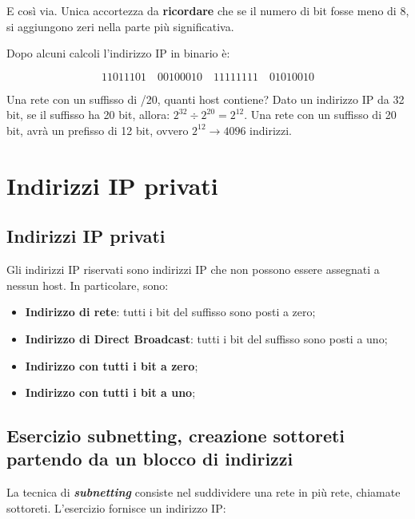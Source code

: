 \documentclass[a4paper]{article}
\newcommand{\binaryaddress}[4]{#1 \hspace{1em} #2 \hspace{1em} #3 \hspace{1em} #4}
\begin{document}
	\noindent
	E così via. Unica accortezza da \textbf{ricordare} che se il numero di bit fosse meno di 8, si aggiungono zeri nella parte più significativa.\newline
	
	\noindent
	Dopo alcuni calcoli l’indirizzo IP in binario è:
	
	\begin{equation*}
		\binaryaddress{11011101}{00100010}{11111111}{01010010}
	\end{equation*}

	\noindent
	Una rete con un suffisso di /20, quanti host contiene? Dato un indirizzo IP da 32 bit, se il suffisso ha 20 bit, allora: $2^{32} \div 2^{20} = 2^{12}$. Una rete con un suffisso di 20 bit, avrà un prefisso di 12 bit, ovvero $2^{12} \longrightarrow 4096$ indirizzi.
	
	\newpage
	
	\section{Indirizzi IP privati}
	
	\subsection{Indirizzi IP privati}
	
	Gli indirizzi IP riservati sono indirizzi IP che non possono essere assegnati a nessun host. In particolare, sono:
	
	\begin{itemize}
		\item \textbf{Indirizzo di rete}: tutti i bit del suffisso sono posti a zero;
		\item \textbf{Indirizzo di Direct Broadcast}: tutti i bit del suffisso sono posti a uno;
		\item \textbf{Indirizzo con tutti i bit a zero};
		\item \textbf{Indirizzo con tutti i bit a uno};
	\end{itemize}

	\subsection{\textcolor{Red3}{Esercizio subnetting, creazione sottoreti partendo da un blocco di indirizzi}}
	
	La tecnica di \textcolor{Red3}{\textbf{\emph{subnetting}}} consiste nel suddividere una rete in più rete, chiamate sottoreti. L'esercizio fornisce un indirizzo IP:
	
\end{document}
